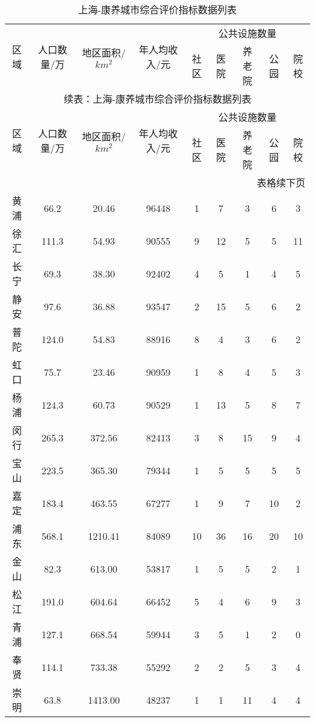 \documentclass[12pt,a4paper]{article}
\begin{document}
\begin{longtable}{c|c|c|c|ccccc}
\caption{上海-康养城市综合评价指标数据列表} \\
\toprule[2pt]
\multirow{2}{*}{区域} & \multirow{2}{*}{人口数量/万} & \multirow{2}{*}{地区面积/$km^2$}& \multirow{2}{*}{年人均收入\cite{05}/元}& \multicolumn{5}{c}{公共设施数量} \\
\cline{5-9}
& & & & 社区 & 医院 & 养老院 & 公园 & 院校 \\
\midrule[1pt]
\endfirsthead

\multicolumn{9}{c}{续表：上海-康养城市综合评价指标数据列表} \\
\toprule[2pt]
\multirow{2}{*}{区域} & \multirow{2}{*}{人口数量/万} & \multirow{2}{*}{地区面积/$km^2$}& \multirow{2}{*}{年人均收入\cite{05}/元}& \multicolumn{5}{c}{公共设施数量} \\
\cline{5-9}
& & & & 社区 & 医院 & 养老院 & 公园 & 院校 \\
\midrule[1pt]
\endhead

\hline
\multicolumn{9}{r}{表格续下页} \\
\endfoot

\hline
\endlastfoot

黄浦 & 66.2 & 20.46 & 96448 & 1 & 7 & 3 & 6 & 3 \\
徐汇 & 111.3 & 54.93 & 90555 & 9 & 12 & 5 & 5 & 11 \\
长宁 & 69.3 & 38.30 & 92402 & 4 & 5 & 1 & 4 & 5 \\
静安 & 97.6 & 36.88 & 93547 & 2 & 15 & 5 & 6 & 2 \\
普陀 & 124.0 & 54.83 & 88916 & 8 & 4 & 3 & 6 & 2 \\
虹口 & 75.7 & 23.46 & 90959 & 1 & 8 & 4 & 5 & 3 \\
杨浦 & 124.3 & 60.73 & 90529 & 1 & 13 & 5 & 8 & 7 \\
闵行 & 265.3 & 372.56 & 82413 & 3 & 8 & 15 & 9 & 4 \\
宝山 & 223.5 & 365.30 & 79344 & 1 & 5 & 5 & 5 & 5 \\
嘉定 & 183.4 & 463.55 & 67277 & 1 & 9 & 7 & 10 & 2 \\
浦东 & 568.1 & 1210.41 & 84089 & 10 & 36 & 16 & 20 & 10 \\
金山 & 82.3 & 613.00 & 53817 & 1 & 5 & 5 & 2 & 1 \\
松江 & 191.0 & 604.64 & 66452 & 5 & 4 & 6 & 9 & 3 \\
青浦 & 127.1 & 668.54 & 59944 & 3 & 5 & 1 & 2 & 0 \\
奉贤 & 114.1 & 733.38 & 55292 & 2 & 2 & 5 & 3 & 4 \\
崇明 & 63.8 & 1413.00 & 48237 & 1 & 1 & 11 & 4 & 4 \\

\bottomrule[2pt]

\end{longtable}
\end{document}
